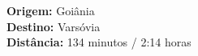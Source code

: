 \documentclass[preview]{standalone}
\begin{document}
\begin{center}
\textbf{Origem:} Goiânia \\
            \textbf{Destino:} Varsóvia \\
            \textbf{Distância:} 134 minutos / 2:14 horas\\
\end{center}
\end{document}
